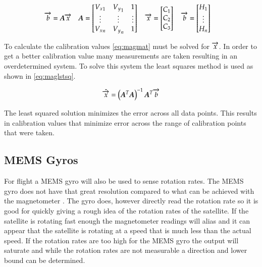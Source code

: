 \begin{equation}
    \overrightarrow{b}=\boldsymbol{A} \overrightarrow{x} \quad
    \boldsymbol{A} =
    \begin{bmatrix}
        {V_x}_1 & {V_y}_1 & 1 \\
        \vdots & \vdots & \vdots\\
        {V_x}_n & {V_y}_n & 1 \\
    \end{bmatrix} \quad
    \overrightarrow{x} = 
    \begin{bmatrix}
        C_1 \\
        C_2 \\
        C_3 \\
    \end{bmatrix} \quad
    \overrightarrow{b} = 
    \begin{bmatrix}
        H_1 \\
        \vdots \\
        H_n \\
    \end{bmatrix} \quad
    \label{eq:magmat}
\end{equation}

To calculate the calibration values \autoref{eq:magmat} must be solved for $\overrightarrow{x}$. In order to get a better calibration value many measurements are taken resulting in an overdetermined system. To solve this system the least squares method is used as shown in \autoref{eq:maglstsq}.

\begin{equation}
    \hat{\overrightarrow{x}} = \left(\boldsymbol{A} ^T \boldsymbol{A} \right) ^ {-1} \boldsymbol{A} ^T \overrightarrow{b}
    \label{eq:maglstsq}
\end{equation}

The least squared solution minimizes the error across all data points. This results in calibration values that minimize error across the range of calibration points that were taken.

\subsection{\acs{MEMS} Gyros}

For flight a \ac{MEMS} gyro will also be used to sense rotation rates. The \ac{MEMS} gyro does not have that great resolution compared to what can be achieved with the magnetometer . The gyro does, however directly read the rotation rate so it is good for quickly giving a rough idea of the rotation rates of the satellite. If the satellite is rotating fast enough the magnetometer readings will alias and it can appear that the satellite is rotating at a speed that is much less than the actual speed. If the rotation rates are too high for the \ac{MEMS} gyro the output will saturate and while the rotation rates are not measurable a direction and lower bound can be determined.


